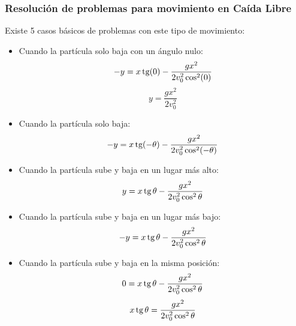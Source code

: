 \subsubsection*{Resolución de problemas para movimiento en Caída Libre}
Existe 5 casos básicos de problemas con este tipo de movimiento: \\ 
\begin{itemize}
	\item Cuando la partícula solo baja con un ángulo nulo:
	$$ -y=x\mathop{\mbox{\normalfont tg}}\nolimits(0)-\frac{gx^2}{2v_0^2\cos^2(0)} $$
	$$ y=\frac{gx^2}{2v_0^2} $$
	\item Cuando la partícula solo baja:
	$$ -y=x\mathop{\mbox{\normalfont tg}}\nolimits(-\theta)-\frac{gx^2}{2v_0^2\cos^2(-\theta)} $$
	\item Cuando la partícula sube y baja en un lugar más alto:
	$$ y=x\mathop{\mbox{\normalfont tg}}\nolimits\theta-\frac{gx^2}{2v_0^2\cos^2\theta} $$
	\item Cuando la partícula sube y baja en un lugar más bajo:
	$$ -y=x\mathop{\mbox{\normalfont tg}}\nolimits\theta-\frac{gx^2}{2v_0^2\cos^2\theta} $$
	\item Cuando la partícula sube y baja en la misma posición:
	$$ 0=x\mathop{\mbox{\normalfont tg}}\nolimits\theta-\frac{gx^2}{2v_0^2\cos^2\theta} $$
	$$ x\mathop{\mbox{\normalfont tg}}\nolimits\theta=\frac{gx^2}{2v_0^2\cos^2\theta} $$
\end{itemize}

